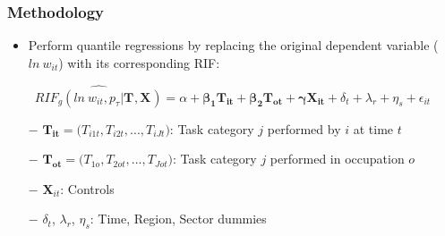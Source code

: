 \documentclass[10pt]{beamer}
\begin{document}
\begin{frame}[label=regression]  
	\frametitle{Methodology}
	
	
	\begin{itemize}
		\item Perform quantile regressions by replacing the original dependent variable ($ln\ w_{it}$) with its corresponding RIF:
	\end{itemize}
	
	
	\begin{equation} \label{6}
	\widehat{RIF_{g}(ln\ w_{it},p_{\tau}| \boldsymbol{T_{}}, \boldsymbol{X_{}}      ) } = \alpha + \boldsymbol{ \beta_{1} } \boldsymbol{T_{it}} + \boldsymbol{ \beta_{2} } \boldsymbol{T_{ot}} + \boldsymbol{ \gamma } \boldsymbol{X_{it}} + \delta_t + \lambda_r + \eta_s  + \epsilon_{it}
	\end{equation} 
	
	\begin{itemize}
		\item[$-$]$\boldsymbol{T_{it}} = \big(T_{i1t}, T_{i2t}, ..., T_{iJt} \big)$: Task category $j$ performed by $i$ at time $t$ \\
		\item[$-$]$\boldsymbol{T_{ot}} = \big(T_{1o}, T_{2ot}, ..., T_{Jot} \big)$: Task category $j$ performed in occupation $o$ \\
		\item[$-$]$\textbf{X}_{it}$: Controls \\
		\item[$-$]$\delta_t$, $\lambda_r$, $\eta_s$: Time, Region, Sector dummies
	\end{itemize} 
	
\hyperlink{occ_spec}{} \\
\hyperlink{wi_spec}{} 	
	
	
	
\end{frame}
\end{document}
